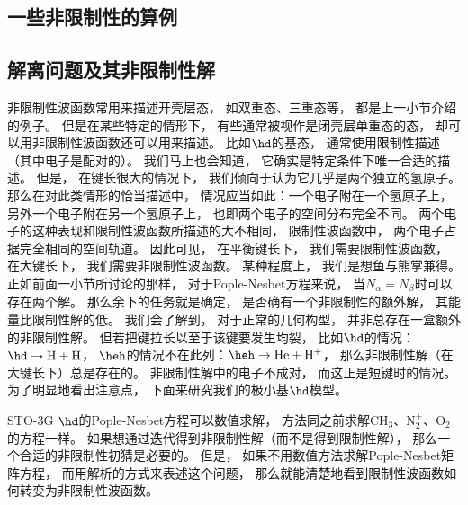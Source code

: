 \subsection{一些非限制性的算例}


\subsection{解离问题及其非限制性解}
非限制性波函数常用来描述开壳层态，
如双重态、三重态等，
都是上一小节介绍的例子。
但是在某些特定的情形下，
有些通常被视作是闭壳层单重态的态，
却可以用非限制性波函数还可以用来描述。
比如$\hd$的基态，
通常使用限制性描述（其中电子是配对的）。
我们马上也会知道，
它确实是特定条件下唯一合适的\hft 描述。
但是，
在键长很大的情况下，
我们倾向于认为它几乎是两个独立的氢原子。
那么在对此类情形的恰当描述中，
情况应当如此：一个电子附在一个氢原子上，
另外一个电子附在另一个氢原子上，
也即两个电子的空间分布完全不同。
两个电子的这种表现和限制性波函数所描述的大不相同，
限制性波函数中，
两个电子占据完全相同的空间轨道。
因此可见，
在平衡键长下，
我们需要限制性波函数，
在大键长下，
我们需要非限制性波函数。
某种程度上，
我们是想鱼与熊掌兼得。
正如前面一小节所讨论的那样，
对于Pople-Nesbet方程来说，
当$N_\alpha=N_\beta$时可以存在两个解。
那么余下的任务就是确定，
是否确有一个非限制性的额外解，
其能量比限制性解的低。
我们会了解到，
对于正常的几何构型，
并非总存在一盒额外的非限制性解。
但若把键拉长以至于该键要发生均裂，
比如$\hd$的情况：$\hd\to \mathrm{H+H}$，
$\heh$的情况不在此列：$\heh\to \mathrm{He+H^+}$，
那么非限制性解（在大键长下）总是存在的。
非限制性解中的电子不成对，
而这正是短键时的情况。
为了明显地看出注意点，
下面来研究我们的极小基$\hd$模型。


STO-3G $\hd$的Pople-Nesbet方程可以数值求解，
方法同之前求解$\mathrm{CH_3}$、$\mathrm{N_2^+}$、$\mathrm{O_2}$的方程一样。
如果想通过迭代得到非限制性解（而不是得到限制性解），
那么一个合适的非限制性初猜是必要的。
但是，
如果不用数值方法求解Pople-Nesbet矩阵方程，
而用解析的方式来表述这个问题，
那么就能清楚地看到限制性波函数如何转变为非限制性波函数。

